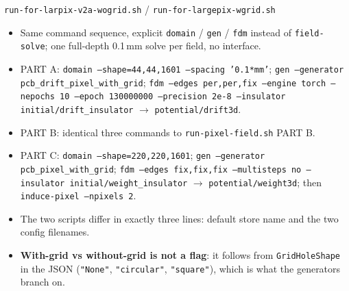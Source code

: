 \documentclass[10pt,aspectratio=169]{beamer}
\newcommand{\ti}[1]{\texttt{\footnotesize #1}}
\begin{document}
\begin{frame}[allowframebreaks]{\texttt{run-for-larpix-v2a-wogrid.sh} / \texttt{run-for-largepix-wgrid.sh}}
  \begin{itemize}\small
  \item Same command sequence, explicit \ti{domain} / \ti{gen} / \ti{fdm} instead of
        \ti{field-solve}; one full-depth 0.1\,mm solve per field, no interface.
  \item PART A: \ti{domain --shape=44,44,1601 --spacing '0.1*mm'}; \ti{gen --generator
        pcb\_drift\_pixel\_with\_grid}; \ti{fdm --edges per,per,fix --engine torch
        --nepochs 10 --epoch 130000000 --precision 2e-8 --insulator initial/drift\_insulator}
        $\rightarrow$ \ti{potential/drift3d}.
  \item PART B: identical three commands to \ti{run-pixel-field.sh} PART B.
  \item PART C: \ti{domain --shape=220,220,1601}; \ti{gen --generator pcb\_pixel\_with\_grid};
        \ti{fdm --edges fix,fix,fix --multisteps no --insulator initial/weight\_insulator}
        $\rightarrow$ \ti{potential/weight3d}; then \ti{induce-pixel --npixels 2}.
  \item The two scripts differ in exactly three lines: default store name and the two
        config filenames.
  \item \textbf{With-grid vs without-grid is not a flag}: it follows from
        \ti{GridHoleShape} in the JSON (\ti{"None"}, \ti{"circular"}, \ti{"square"}),
        which is what the generators branch on.
  \end{itemize}
\end{frame}
\end{document}
